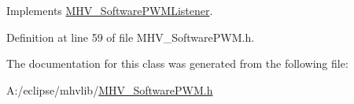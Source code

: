\-Implements \hyperlink{class_m_h_v___software_p_w_m_listener_a8aab80a3527516e82a6019a0574f30b2}{\-M\-H\-V\-\_\-\-Software\-P\-W\-M\-Listener}.



\-Definition at line 59 of file \-M\-H\-V\-\_\-\-Software\-P\-W\-M.\-h.



\-The documentation for this class was generated from the following file\-:\begin{DoxyCompactItemize}
\item 
\-A\-:/eclipse/mhvlib/\hyperlink{_m_h_v___software_p_w_m_8h}{\-M\-H\-V\-\_\-\-Software\-P\-W\-M.\-h}\end{DoxyCompactItemize}
